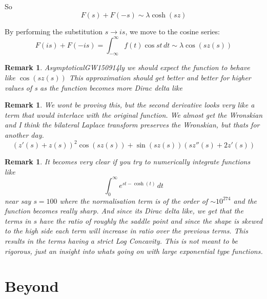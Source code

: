\documentclass[11pt]{article}
\theoremstyle{breakdef}
\newtheorem{remark}[theorem]{Remark}
\begin{document}
So
\begin{equation}
F(s)+F(-s) \sim \lambda \cosh(s z)
\end{equation}

By performing the substitution $s \to is$, we move to the cosine series:
\begin{equation}
    F(is) + F(-is) = \int_{-\infty }^{\infty } f(t) \cos{s t} \, dt \sim  \lambda \cos(s z(s))
\end{equation}


\begin{remark}
AsymptoticalGW150914ly we should expect the function to behave like $\cos(s z(s))$
This approximation should get better and better for higher values of s as the function becomes more Dirac delta  like
\end{remark}
\begin{remark}
We wont be proving this, but the second derivative looks very like a term that would interlace with the original function.  We almost get the Wronskian and I think the bilateral Laplace transform preserves the Wronskian, but thats for another day.
\begin{equation}
\left( z'(s)+z(s)\right)^2 \cos (s z(s))+\sin (s z(s)) \left(s z''(s)+2 z'(s)\right)
\end{equation}

\end{remark}
\begin{remark}
It becomes very clear if you try to numerically integrate functions like
\begin{equation}
\int_0^{\infty } e^{s t-\cosh (t)} \, dt
\end{equation}
near say $s=100$ where the normalisation term is of the order of $\sim 10^{274}$ and the function becomes really sharp.  And since its Dirac delta like, we get that the terms in $s$ have the ratio of roughly the saddle point and since the shape is skewed to the high side each term will increase in ratio over the previous terms.  This results in the terms having a strict Log Concavity. This is not meant to be rigorous, just an insight into whats going on with large exponential type functions.
\end{remark}


\section{Beyond}
\end{document}
